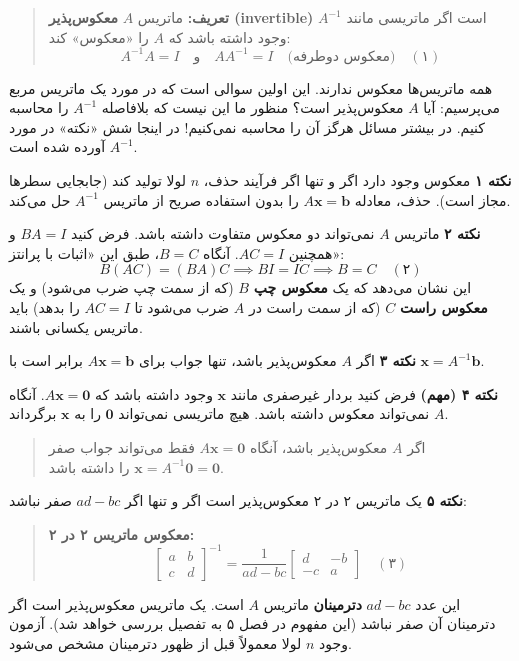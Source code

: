 \documentclass[12pt, a4paper]{book}
\begin{document}
	\begin{quote}
		\textbf{تعریف:} ماتریس $A$ \textbf{معکوس‌پذیر (invertible)} است اگر ماتریسی مانند $A^{-1}$ وجود داشته باشد که $A$ را «معکوس» کند:
		\[ A^{-1}A = I \quad \text{و} \quad AA^{-1} = I \quad \text{(معکوس دوطرفه)} \quad (۱) \]
	\end{quote}
	
	همه ماتریس‌ها معکوس ندارند. این اولین سوالی است که در مورد یک ماتریس مربع می‌پرسیم: آیا $A$ معکوس‌پذیر است؟ منظور ما این نیست که بلافاصله $A^{-1}$ را محاسبه کنیم. در بیشتر مسائل هرگز آن را محاسبه نمی‌کنیم! در اینجا شش «نکته» در مورد $A^{-1}$ آورده شده است.
	
	\textbf{نکته ۱}
	معکوس وجود دارد اگر و تنها اگر فرآیند حذف، $n$ لولا تولید کند (جابجایی سطرها مجاز است). حذف، معادله $A\mathbf{x}=\mathbf{b}$ را بدون استفاده صریح از ماتریس $A^{-1}$ حل می‌کند.
	
	\textbf{نکته ۲}
	ماتریس $A$ نمی‌تواند دو معکوس متفاوت داشته باشد. فرض کنید $BA=I$ و همچنین $AC=I$. آنگاه $B=C$، طبق این «اثبات با پرانتز»:
	\[ B(AC) = (BA)C \implies BI = IC \implies B = C \quad (۲) \]
	این نشان می‌دهد که یک \textbf{معکوس چپ} $B$ (که از سمت چپ ضرب می‌شود) و یک \textbf{معکوس راست} $C$ (که از سمت راست در $A$ ضرب می‌شود تا $AC=I$ را بدهد) باید ماتریس یکسانی باشند.
	
	\textbf{نکته ۳}
	اگر $A$ معکوس‌پذیر باشد، تنها جواب برای $A\mathbf{x}=\mathbf{b}$ برابر است با $\mathbf{x}=A^{-1}\mathbf{b}$.
	
	\textbf{نکته ۴ (مهم)}
	فرض کنید بردار غیرصفری مانند $\mathbf{x}$ وجود داشته باشد که $A\mathbf{x}=\mathbf{0}$. آنگاه $A$ نمی‌تواند معکوس داشته باشد. هیچ ماتریسی نمی‌تواند $\mathbf{0}$ را به $\mathbf{x}$ برگرداند.
	\begin{quote}
		اگر $A$ معکوس‌پذیر باشد، آنگاه $A\mathbf{x}=\mathbf{0}$ فقط می‌تواند جواب صفر $\mathbf{x}=A^{-1}\mathbf{0}=\mathbf{0}$ را داشته باشد.
	\end{quote}
	
	\textbf{نکته ۵}
	یک ماتریس ۲ در ۲ معکوس‌پذیر است اگر و تنها اگر $ad-bc$ صفر نباشد:
	\begin{quote}
		\textbf{معکوس ماتریس ۲ در ۲:}
		\[
		\begin{bmatrix} a & b \\ c & d \end{bmatrix}^{-1} = \frac{1}{ad-bc} \begin{bmatrix} d & -b \\ -c & a \end{bmatrix} \quad (۳)
		\]
	\end{quote}
	این عدد $ad-bc$ \textbf{دترمینان} ماتریس $A$ است. یک ماتریس معکوس‌پذیر است اگر دترمینان آن صفر نباشد (این مفهوم در فصل ۵ به تفصیل بررسی خواهد شد). آزمون وجود $n$ لولا معمولاً قبل از ظهور دترمینان مشخص می‌شود.
	
\end{document}
